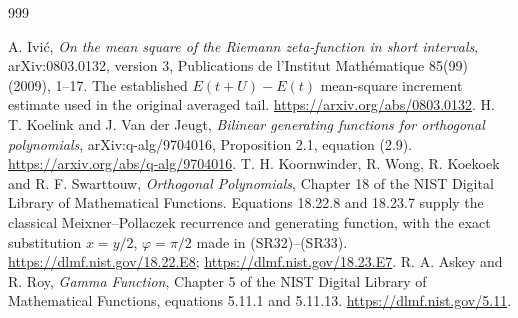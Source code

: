 \begin{thebibliography}{999}

 A. Ivi\'c, \emph{On the mean square of the Riemann zeta-function
in short intervals}, arXiv:0803.0132, version 3, Publications de l'Institut
Math\'ematique 85(99) (2009), 1--17. The established $E(t+U)-E(t)$
mean-square increment estimate used in the original averaged tail.
\url{https://arxiv.org/abs/0803.0132}.
 H. T. Koelink and J. Van der Jeugt,
\emph{Bilinear generating functions for orthogonal polynomials},
arXiv:q-alg/9704016, Proposition 2.1, equation (2.9).
\url{https://arxiv.org/abs/q-alg/9704016}.
 T. H. Koornwinder, R. Wong, R. Koekoek and R. F. Swarttouw,
\emph{Orthogonal Polynomials}, Chapter 18 of the NIST Digital Library of
Mathematical Functions. Equations 18.22.8 and 18.23.7 supply the classical
Meixner--Pollaczek recurrence and generating function, with the exact
substitution $x=y/2$, $\varphi=\pi/2$ made in (SR32)--(SR33).
\url{https://dlmf.nist.gov/18.22.E8};
\url{https://dlmf.nist.gov/18.23.E7}.
 R. A. Askey and R. Roy, \emph{Gamma Function}, Chapter 5
of the NIST Digital Library of Mathematical Functions, equations 5.11.1 and
5.11.13. \url{https://dlmf.nist.gov/5.11}.


\end{thebibliography}

